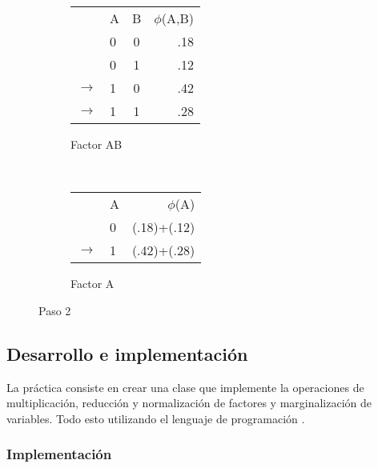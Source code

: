 
\begin{figure}[H]
    \centering
    \begin{subfigure}[b]{0.4\textwidth}
        \centering
        \begin{tabular}{ l l  c | r }
           & A & B & $\phi$(A,B)\\ \cline{2-4}
           & 0 & 0 & .18  \\ \cline{2-4}
           & 0 & 1 & .12  \\ \cline{2-4}
          \(\to\) & 1 & 0 & .42  \\ \cline{2-4}
          \(\to\) & 1 & 1 & .28  \\
        \end{tabular}
        \caption{Factor AB}
    \end{subfigure}
    ~ 
    \begin{subfigure}[b]{0.4\textwidth}
        \centering
        \begin{tabular}{l  l | r }
            & A & $\phi$(A)\\ \cline{2-3}
            & 0 & (.18)+(.12)  \\ \cline{2-3}
        \(\to\) & 1 & (.42)+(.28)  \\
        \end{tabular}
        \caption{Factor A}
    \end{subfigure}
    \caption{Paso 2}
\end{figure}


\subsection{Desarrollo e implementaci\'on}

\noindent La práctica consiste en crear una clase  que implemente la operaciones de multiplicación, reducción y normalización de factores y marginalización de variables. Todo esto utilizando el lenguaje de programación .


\subsubsection{Implementaci\'on}

